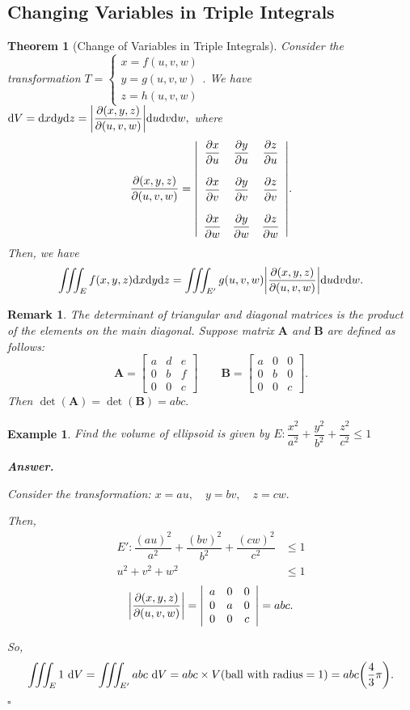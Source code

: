 \documentclass[12pt,a4paper]{article}
\newtheorem{thm}{Theorem}[subsection]
\newtheorem{eg}{Example}[subsection]
\newenvironment*{ans}{\par\indent\textbf{\textit{Answer. }}\par}{\par\hfill{$\square$}\par}
\newtheorem*{rmk}{\indent Remark}
\def\dsst{\displaystyle}
\def\d{{\mathrm{d}}}
\def\dx{\d x}
\def\dy{\d y}
\def\dz{\d z}
\def\dV{\d V}
\def\del{\partial}
\def\iiintE{\dsst\iiint_E}
\begin{document}
\subsection{Changing Variables in Triple Integrals}
\begin{thm}[Change of Variables in Triple Integrals]
	Consider the transformation $T=\begin{cases}x=f(u,v,w)\\y=g(u,v,w)\\z=h(u,v,w)\end{cases}.$ We have $\dV=\dx\dy\dz=\qty|\dfrac{\del(x,y,z)}{\del(u,v,w)}|\d u\d v\d w,$ where \[\dfrac{\del(x,y,z)}{\del(u,v,w)}=\qty|\begin{array}{ccc}\dfrac{\del x}{\del u}&\dfrac{\del y}{\del u}&\dfrac{\del z}{\del u}\\\\\dfrac{\del x}{\del v}&\dfrac{\del y}{\del v}&\dfrac{\del z}{\del v}\\\\\dfrac{\del x}{\del w}&\dfrac{\del y}{\del w}&\dfrac{\del z}{\del w}\end{array}|.\] Then, we have \[\iiintE f(x,y,z)\dx\dy\dz=\iiint_{E'}g(u,v,w)\qty|\dfrac{\del(x,y,z)}{\del(u,v,w)}|\d u\d v\d w.\]
\end{thm}
\begin{rmk}
	The determinant of triangular and diagonal matrices is the product of the elements on the main diagonal. Suppose matrix $\mathbf{A}$ and $\mathbf{B}$ are defined as follows: \[\mathbf{A}=\begin{bmatrix}a&d&e\\0&b&f\\0&0&c\end{bmatrix}\qquad\mathbf{B}=\begin{bmatrix}a&0&0\\0&b&0\\0&0&c\end{bmatrix}.\] Then $\det(\mathbf{A})=\det(\mathbf{B})=abc.$
\end{rmk}
\begin{eg}
Find the volume of ellipsoid is given by $E: \dfrac{x^2}{a^2}+\dfrac{y^2}{b^2}+\dfrac{z^2}{c^2}\leq1$
\begin{ans}
	Consider the transformation: $x=au,\quad y=bv,\quad z=cw.$\par Then, \[\begin{aligned} E': \dfrac{(au)^2}{a^2}+\dfrac{(bv)^2}{b^2}+\dfrac{(cw)^2}{c^2}&\leq1\\u^2+v^2+w^2&\leq1\end{aligned}\] \[\qty|\dfrac{\del(x,y,z)}{\del(u,v,w)}|=\qty|\begin{array}{ccc}a&0&0\\0&a&0\\0&0&c\end{array}|=abc.\]\par So, \[\iiintE1\  \dV=\iiint_{E'}abc\ \dV=abc\times V(\text{ball with radius}=1)=abc\qty(\dfrac{4}{3}\pi).\]
\end{ans}
\end{eg}
\end{document}
